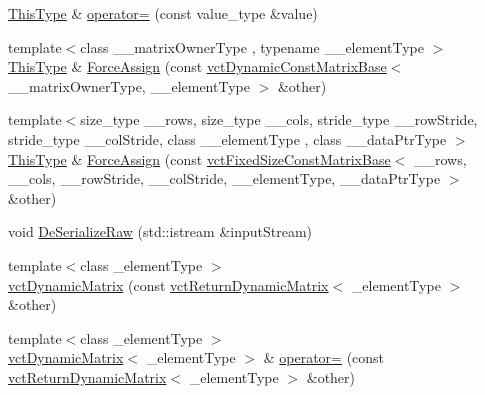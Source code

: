 \begin{DoxyCompactItemize}
\item 
\hyperlink{classvct_dynamic_const_matrix_base_ac4ff48cbe4d9de3fdef5a02447ffb9db}{This\+Type} \& \hyperlink{classvct_dynamic_matrix_ae454cb17930864f98478bab90deea523}{operator=} (const value\+\_\+type \&value)
\item 
{\footnotesize template$<$class \+\_\+\+\_\+matrix\+Owner\+Type , typename \+\_\+\+\_\+element\+Type $>$ }\\\hyperlink{classvct_dynamic_const_matrix_base_ac4ff48cbe4d9de3fdef5a02447ffb9db}{This\+Type} \& \hyperlink{classvct_dynamic_matrix_a54c7ee11cd1cc092850b9c38e248a72d}{Force\+Assign} (const \hyperlink{classvct_dynamic_const_matrix_base}{vct\+Dynamic\+Const\+Matrix\+Base}$<$ \+\_\+\+\_\+matrix\+Owner\+Type, \+\_\+\+\_\+element\+Type $>$ \&other)
\item 
{\footnotesize template$<$size\+\_\+type \+\_\+\+\_\+rows, size\+\_\+type \+\_\+\+\_\+cols, stride\+\_\+type \+\_\+\+\_\+row\+Stride, stride\+\_\+type \+\_\+\+\_\+col\+Stride, class \+\_\+\+\_\+element\+Type , class \+\_\+\+\_\+data\+Ptr\+Type $>$ }\\\hyperlink{classvct_dynamic_const_matrix_base_ac4ff48cbe4d9de3fdef5a02447ffb9db}{This\+Type} \& \hyperlink{classvct_dynamic_matrix_abafc3cf32fa44ce0db81b58c4c5756f5}{Force\+Assign} (const \hyperlink{classvct_fixed_size_const_matrix_base}{vct\+Fixed\+Size\+Const\+Matrix\+Base}$<$ \+\_\+\+\_\+rows, \+\_\+\+\_\+cols, \+\_\+\+\_\+row\+Stride, \+\_\+\+\_\+col\+Stride, \+\_\+\+\_\+element\+Type, \+\_\+\+\_\+data\+Ptr\+Type $>$ \&other)
\item 
void \hyperlink{classvct_dynamic_matrix_a29ee09b8c6539a5cc0aebb8f8fcb370a}{De\+Serialize\+Raw} (std\+::istream \&input\+Stream)
\item 
{\footnotesize template$<$class \+\_\+element\+Type $>$ }\\\hyperlink{classvct_dynamic_matrix_aebecf9456fca906714dcc7acdefdf217}{vct\+Dynamic\+Matrix} (const \hyperlink{classvct_return_dynamic_matrix}{vct\+Return\+Dynamic\+Matrix}$<$ \+\_\+element\+Type $>$ \&other)
\item 
{\footnotesize template$<$class \+\_\+element\+Type $>$ }\\\hyperlink{classvct_dynamic_matrix}{vct\+Dynamic\+Matrix}$<$ \+\_\+element\+Type $>$ \& \hyperlink{classvct_dynamic_matrix_aeb7ddcac2f89742b03220af2fa259436}{operator=} (const \hyperlink{classvct_return_dynamic_matrix}{vct\+Return\+Dynamic\+Matrix}$<$ \+\_\+element\+Type $>$ \&other)
\end{DoxyCompactItemize}
{\bf }\par

